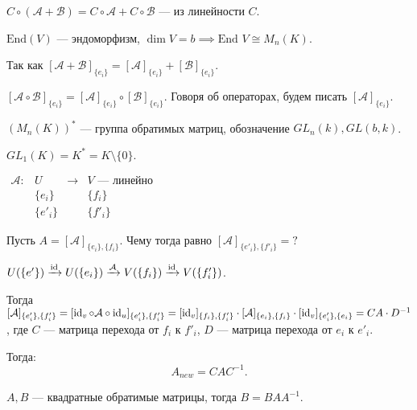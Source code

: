 $C \circ (\mathcal{A} + \mathcal{B}) = C \circ \mathcal{A} + C \circ \mathcal{B}$ --- из линейности $C$.

 \begin{definition}
     $\text{End}(V)$ --- эндоморфизм,  $\dim V = b \implies \text{End } V \cong M_n(K)$.
\end{definition}

Так как $[\mathcal{A} + \mathcal{B}]_{\{e_i\}} = [\mathcal{A}]_{\{e_i\}} + [\mathcal{B}]_{\{e_i\}}$.

$[\mathcal{A} \circ \mathcal{B}]_{\{e_i\}} = [\mathcal{A}]_{\{e_i\}} \circ [\mathcal{B}]_{\{e_i\}}$. Говоря об операторах, будем писать  $[\mathcal{A}]_{\{e_i\}}$.

$\left(M_n(K)\right)^*$ --- группа обратимых матриц, обозначение  $GL_n(k), GL(b, k)$.

\begin{example}
    $GL_1(K) = K^* = K \setminus \{0\}$.
\end{example}

$\begin{array}{llll} \mathcal{A}\!: & U & \to & V\text{ --- линейно} \\ & \{e_i\} && \{f_i\} \\ & \{e'_i\} && \{f'_i\} \end{array}$

Пусть  $A = [\mathcal{A}]_{\{e_i\}, \{f_i\}}$. Чему тогда равно  $[\mathcal{A}]_{\{e'_i\}, \{f'_i\}} = ?$

$U (\{e'\}) \xrightarrow{\operatorname{id}} U(\{e_i\}) \xrightarrow{\mathcal{A}} V (\{f_i\}) \xrightarrow{\operatorname{id}} V(\{f'_i\})$.

Тогда  $[\mathcal{A}]_{\{e'_i\}, \{f'_i\}} = [\operatorname{id}_v \circ \mathcal{A} \circ \operatorname{id}_u]_{\{e'_i\}, \{f'_i\}} = [\operatorname{id}_v]_{\{f_i\}, \{f'_i\}} \cdot [\mathcal{A}]_{\{e_i\}, \{f_i\}} \cdot [\operatorname{id}_v]_{\{e'_i\}, \{e_i\}} = C A \cdot D^{-1}$, где  $C$ --- матрица перехода от  $f_i$ к  $f'_i$,  $D$ --- матрица перехода  от $e_i$ к  $e'_i$.

Тогда:  \[
    A_{new} = C A C^{-1}
.\]

$A, B$ --- квадратные обратимые матрицы, тогда  $B = B A A^{-1}$.

